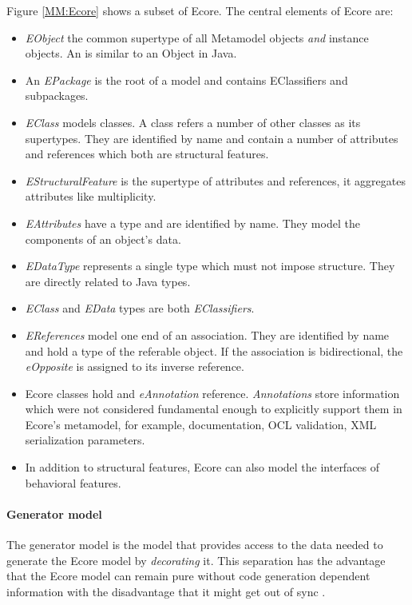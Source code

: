 Figure \ref{MM:Ecore} shows a subset of Ecore. The central elements of Ecore are:\\
\begin{itemize}
	\item \emph{EObject} the common supertype of all Metamodel objects \emph{and} instance objects. An  is similar to an Object in Java.
	\item An \emph{EPackage} is the root of a model and contains EClassifiers and subpackages.
	\item \emph{EClass} models classes. A class refers a number of other classes as its supertypes. They are identified by name and contain a number of attributes and references which both are structural features.
	\item \emph{EStructuralFeature} is the supertype of attributes and references, it aggregates attributes like multiplicity.
	\item \emph{EAttributes} have a type and are identified by name. They model the components of an object's data.
	\item \emph{EDataType} represents a single type which must not impose structure. They are directly related to Java types.
	\item \emph{EClass} and \emph{EData} types are both \emph{EClassifiers}.
	\item \emph{EReferences} model one end of an association. They are identified by name and hold a type of the referable object. If the association is bidirectional, the \emph{eOpposite} is assigned to its inverse reference. \cite{EMF2nd}
	\item Ecore classes hold and \emph{eAnnotation} reference. \emph{Annotations} store information which were not considered fundamental enough to explicitly support them in Ecore's metamodel, for example, documentation, OCL validation, XML serialization parameters. \cite{EMP}
	\item In addition to structural features, Ecore can also model the interfaces of behavioral features.
\end{itemize}

\paragraph{Generator model}
The generator model is the model that provides access to the data needed to generate the Ecore model by \emph{decorating} it. This separation has the advantage that the Ecore model can remain pure without code generation dependent information with the disadvantage that it might get out of sync \cite{EMF2nd}.


